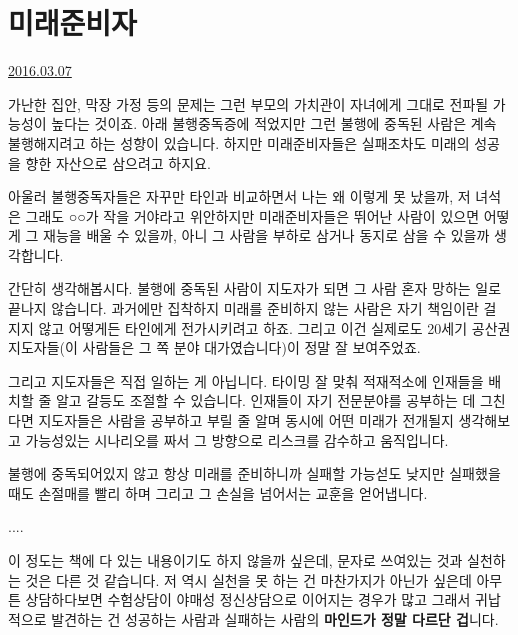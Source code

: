 \section{미래준비자}
\href{https://www.kockoc.com/Apoc/666823}{2016.03.07}

\vspace{5mm}

가난한 집안, 막장 가정 등의 문제는 그런 부모의 가치관이 자녀에게 그대로 전파될 가능성이 높다는 것이죠.
아래 불행중독증에 적었지만 그런 불행에 중독된 사람은 계속 불행해지려고 하는 성향이 있습니다.
하지만 미래준비자들은 실패조차도 미래의 성공을 향한 자산으로 삼으려고 하지요.
\vspace{5mm}

아울러 불행중독자들은 자꾸만 타인과 비교하면서 나는 왜 이렇게 못 났을까, 저 녀석은 그래도 ○○가 작을 거야라고 위안하지만
미래준비자들은 뛰어난 사람이 있으면 어떻게 그 재능을 배울 수 있을까, 아니 그 사람을 부하로 삼거나 동지로 삼을 수 있을까 생각합니다.
\vspace{5mm}

간단히 생각해봅시다.
불행에 중독된 사람이 지도자가 되면 그 사람 혼자 망하는 일로 끝나지 않습니다.
과거에만 집착하지 미래를 준비하지 않는 사람은 자기 책임이란 걸 지지 않고 어떻게든 타인에게 전가시키려고 하죠.
그리고 이건 실제로도 20세기 공산권 지도자들(이 사람들은 그 쪽 분야 대가였습니다)이 정말 잘 보여주었죠.
\vspace{5mm}

그리고 지도자들은 직접 일하는 게 아닙니다. 타이밍 잘 맞춰 적재적소에 인재들을 배치할 줄 알고 갈등도 조절할 수 있습니다.
인재들이 자기 전문분야를 공부하는 데 그친다면 지도자들은 사람을 공부하고 부릴 줄 알며
동시에 어떤 미래가 전개될지 생각해보고 가능성있는 시나리오를 짜서 그 방향으로 리스크를 감수하고 움직입니다.
\vspace{5mm}

불행에 중독되어있지 않고 항상 미래를 준비하니까 실패할 가능섣도 낮지만
실패했을 때도 손절매를 빨리 하며 그리고 그 손실을 넘어서는 교훈을 얻어냅니다.
\vspace{5mm}

....
\vspace{5mm}

이 정도는 책에 다 있는 내용이기도 하지 않을까 싶은데, 문자로 쓰여있는 것과 실천하는 것은 다른 것 같습니다.
저 역시 실천을 못 하는 건 마찬가지가 아닌가 싶은데
아무튼 상담하다보면 수험상담이 야매성 정신상담으로 이어지는 경우가 많고
그래서 귀납적으로 발견하는 건 성공하는 사람과 실패하는 사람의 \textbf{마인드가 정말 다르단 겁}니다.
\vspace{5mm}


